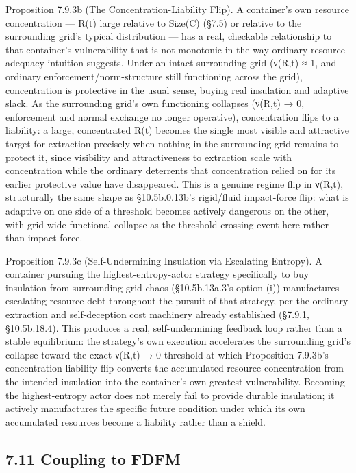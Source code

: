 \documentclass[
]{article}
\begin{document}
Proposition 7.9.3b (The Concentration-Liability Flip). A container's own
resource concentration --- R(t) large relative to Size(C) (§7.5) or
relative to the surrounding grid's typical distribution --- has a real,
checkable relationship to that container's vulnerability that is not
monotonic in the way ordinary resource-adequacy intuition suggests.
Under an intact surrounding grid (ν(R,t) ≈ 1, and ordinary
enforcement/norm-structure still functioning across the grid),
concentration is protective in the usual sense, buying real insulation
and adaptive slack. As the surrounding grid's own functioning collapses
(ν(R,t) → 0, enforcement and normal exchange no longer operative),
concentration flips to a liability: a large, concentrated R(t) becomes
the single most visible and attractive target for extraction precisely
when nothing in the surrounding grid remains to protect it, since
visibility and attractiveness to extraction scale with concentration
while the ordinary deterrents that concentration relied on for its
earlier protective value have disappeared. This is a genuine regime flip
in ν(R,t), structurally the same shape as §10.5b.0.13b's rigid/fluid
impact-force flip: what is adaptive on one side of a threshold becomes
actively dangerous on the other, with grid-wide functional collapse as
the threshold-crossing event here rather than impact force.

Proposition 7.9.3c (Self-Undermining Insulation via Escalating Entropy).
A container pursuing the highest-entropy-actor strategy specifically to
buy insulation from surrounding grid chaos (§10.5b.13a.3's option (i))
manufactures escalating resource debt throughout the pursuit of that
strategy, per the ordinary extraction and self-deception cost machinery
already established (§7.9.1, §10.5b.18.4). This produces a real,
self-undermining feedback loop rather than a stable equilibrium: the
strategy's own execution accelerates the surrounding grid's collapse
toward the exact ν(R,t) → 0 threshold at which Proposition 7.9.3b's
concentration-liability flip converts the accumulated resource
concentration from the intended insulation into the container's own
greatest vulnerability. Becoming the highest-entropy actor does not
merely fail to provide durable insulation; it actively manufactures the
specific future condition under which its own accumulated resources
become a liability rather than a shield.

\hypertarget{coupling-to-fdfm}{%
\subsection{7.11 Coupling to FDFM}\label{coupling-to-fdfm}}
\end{document}
